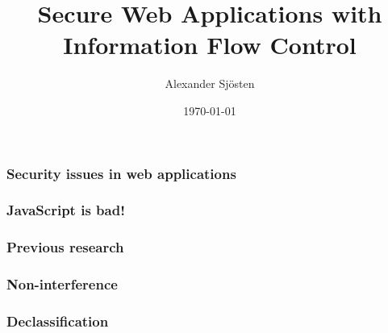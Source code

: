 \documentclass{beamer}
\title[SWAP-IFC]{Secure Web Applications with Information Flow Control}
\author{Alexander Sjösten}
\institute[GU]
{
Master's Thesis in Computer Science \\
\medskip
Examiner: Andrei Sabelfeld 
}
\date{\today}
\begin{document}
\begin{frame}
\titlepage
\end{frame}



\begin{frame}
  \frametitle{Security issues in web applications}
  
\end{frame}


\begin{frame}
  \frametitle{JavaScript is bad!}
  
\end{frame}


\begin{frame}
  \frametitle{Previous research}
  
\end{frame}


\begin{frame}
  \frametitle{Non-interference}
  
\end{frame}


\begin{frame}
  \frametitle{Declassification}
  
\end{frame}
\end{document}
